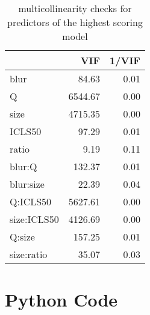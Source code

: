 \documentclass[12pt]{article}
\begin{document}
\begin{table}[h]
	\centering
	\caption{multicollinearity checks for predictors of the highest scoring model}
	\begin{tabular}{lrr}
	  \toprule
	 & VIF & 1/VIF \\ 
	  \midrule
	blur & 84.63 & 0.01 \\ 
	  Q & 6544.67 & 0.00 \\ 
	  size & 4715.35 & 0.00 \\ 
	  ICLS50 & 97.29 & 0.01 \\ 
	  ratio & 9.19 & 0.11 \\ 
	  blur:Q & 132.37 & 0.01 \\ 
	  blur:size & 22.39 & 0.04 \\ 
	  Q:ICLS50 & 5627.61 & 0.00 \\ 
	  size:ICLS50 & 4126.69 & 0.00 \\ 
	  Q:size & 157.25 & 0.01 \\ 
	  size:ratio & 35.07 & 0.03 \\ 
	   \bottomrule
	\end{tabular}
	\label{tab:vif}
\end{table}

\clearpage
\section{Python Code}\label{Apycode}
\end{document}
